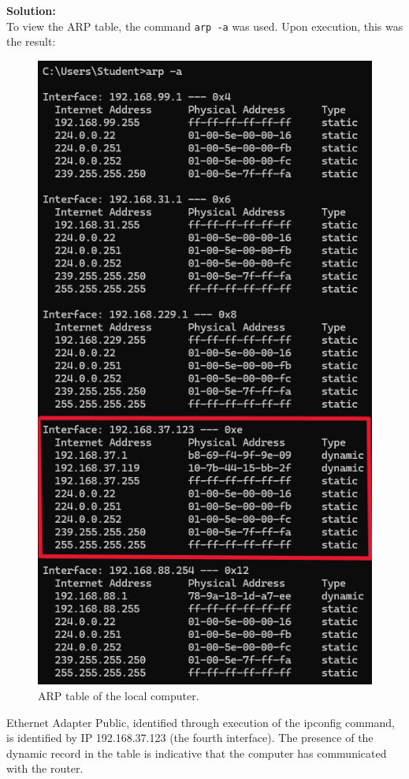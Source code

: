\documentclass[a4paper,12pt]{article}
\begin{document}
\vspace{0.5em}
\textbf{Solution:} \\
To view the ARP table, the command \texttt{arp -a} was used. Upon execution, this was the result:
\begin{figure}[H]
\centering
\includegraphics[width=\linewidth, height=0.55\textheight, keepaspectratio]{Pictures_Lab1/objective 1p1.png}
\caption{ARP table of the local computer.}
\end{figure}
Ethernet Adapter Public, identified through execution of the ipconfig command, is identified by IP 192.168.37.123 (the fourth interface). 
The presence of the dynamic record in the table is indicative that the computer has communicated with the router.
\end{document}
